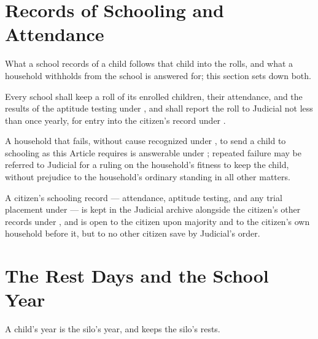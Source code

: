 \section{Records of Schooling and Attendance}
\label{sec:schooling:records-of-schooling-and-attendance}

What a school records of a child follows that child into the rolls, and what a household withholds from the school is answered for; this section sets down both.

\begin{clauses}
\item Every school shall keep a roll of its enrolled children, their attendance, and the results of the aptitude testing under , and shall report the roll to Judicial not less than once yearly, for entry into the citizen's record under .
\item A household that fails, without cause recognized under , to send a child to schooling as this Article requires is answerable under ; repeated failure may be referred to Judicial for a ruling on the household's fitness to keep the child, without prejudice to the household's ordinary standing in all other matters.
\item A citizen's schooling record --- attendance, aptitude testing, and any trial placement under  --- is kept in the Judicial archive alongside the citizen's other records under , and is open to the citizen upon majority and to the citizen's own household before it, but to no other citizen save by Judicial's order.
\end{clauses}

\section{The Rest Days and the School Year}
\label{sec:schooling:rest-days-and-the-school-year}

A child's year is the silo's year, and keeps the silo's rests.

